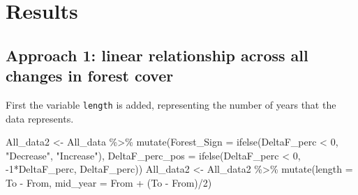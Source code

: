 \documentclass[]{elsarticle} %
\newenvironment{Shaded}{\begin{snugshade}}{\end{snugshade}}
\newcommand{\AttributeTok}[1]{\textcolor[rgb]{0.77,0.63,0.00}{#1}}
\newcommand{\DecValTok}[1]{\textcolor[rgb]{0.00,0.00,0.81}{#1}}
\newcommand{\FunctionTok}[1]{\textcolor[rgb]{0.00,0.00,0.00}{#1}}
\newcommand{\NormalTok}[1]{#1}
\newcommand{\OtherTok}[1]{\textcolor[rgb]{0.56,0.35,0.01}{#1}}
\newcommand{\SpecialCharTok}[1]{\textcolor[rgb]{0.00,0.00,0.00}{#1}}
\newcommand{\StringTok}[1]{\textcolor[rgb]{0.31,0.60,0.02}{#1}}
\begin{document}
\hypertarget{results}{%
\section{Results}\label{results}}

\hypertarget{approach-1-linear-relationship-across-all-changes-in-forest-cover}{%
\subsection{Approach 1: linear relationship across all changes in forest cover}\label{approach-1-linear-relationship-across-all-changes-in-forest-cover}}

First the variable \texttt{length} is added, representing the number of years that the data represents.

\begin{Shaded}
\begin{Highlighting}[]
\NormalTok{All\_data2 }\OtherTok{\textless{}{-}}\NormalTok{ All\_data }\SpecialCharTok{\%\textgreater{}\%}
  \FunctionTok{mutate}\NormalTok{(}\AttributeTok{Forest\_Sign =} \FunctionTok{ifelse}\NormalTok{(DeltaF\_perc }\SpecialCharTok{\textless{}} \DecValTok{0}\NormalTok{,}
                              \StringTok{"Decrease"}\NormalTok{, }\StringTok{"Increase"}\NormalTok{),}
         \AttributeTok{DeltaF\_perc\_pos =} \FunctionTok{ifelse}\NormalTok{(DeltaF\_perc }\SpecialCharTok{\textless{}} \DecValTok{0}\NormalTok{,}
                                  \SpecialCharTok{{-}}\DecValTok{1}\SpecialCharTok{*}\NormalTok{DeltaF\_perc,}
\NormalTok{                                  DeltaF\_perc))}
\NormalTok{All\_data2 }\OtherTok{\textless{}{-}}\NormalTok{ All\_data2 }\SpecialCharTok{\%\textgreater{}\%}
  \FunctionTok{mutate}\NormalTok{(}\AttributeTok{length =}\NormalTok{ To }\SpecialCharTok{{-}}\NormalTok{ From,}
         \AttributeTok{mid\_year =}\NormalTok{ From }\SpecialCharTok{+}\NormalTok{ (To }\SpecialCharTok{{-}}\NormalTok{ From)}\SpecialCharTok{/}\DecValTok{2}\NormalTok{)}


\end{Highlighting}
\end{Shaded}
\end{document}
